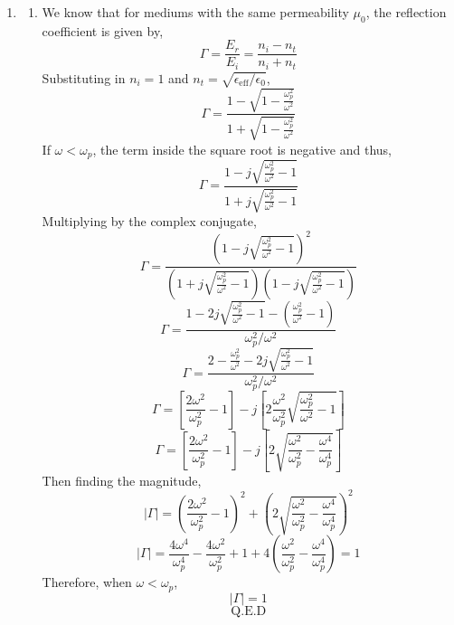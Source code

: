 \documentclass[12pt]{article}
\begin{document}
\begin{enumerate}
	\item [7.3]
	\begin{enumerate}
		\item [(a)]
		We know that for mediums with the same permeability $\mu_0$, the reflection coefficient is given by,
		\[\Gamma = \frac{E_r}{E_i}=\frac{n_i-n_t}{n_i+n_t}\]
		Substituting in $n_i=1$ and $n_t=\sqrt{\epsilon_{\mathrm{eff}}/\epsilon_0}$,
		\[\Gamma = \frac{1-\sqrt{1-\frac{\omega_p^2}{\omega^2}}}{1+\sqrt{1-\frac{\omega_p^2}{\omega^2}}}\]
		If $\omega<\omega_p$, the term inside the square root is negative and thus,
		\[\Gamma = \frac{1-j\sqrt{\frac{\omega_p^2}{\omega^2}-1}}{1+j\sqrt{\frac{\omega_p^2}{\omega^2}-1}}\]
		Multiplying by the complex conjugate,
		\[\Gamma = \frac{\left(1-j\sqrt{\frac{\omega_p^2}{\omega^2}-1}\right)^2}{\left(1+j\sqrt{\frac{\omega_p^2}{\omega^2}-1}\right)\left(1-j\sqrt{\frac{\omega_p^2}{\omega^2}-1}\right)}\]
		\[\Gamma = \frac{1-2j\sqrt{\frac{\omega_p^2}{\omega^2}-1}-\left(\frac{\omega_p^2}{\omega^2}-1\right)}{\omega_p^2/\omega^2}\]
		\[\Gamma = \frac{2-\frac{\omega_p^2}{\omega^2}-2j\sqrt{\frac{\omega_p^2}{\omega^2}-1}}{\omega_p^2/\omega^2}\]
		\[\Gamma = \left[\frac{2\omega^2}{\omega_p^2}-1\right]-j\left[2\frac{\omega^2}{\omega_p^2}\sqrt{\frac{\omega_p^2}{\omega^2}-1}\right]\]
		\[\Gamma = \left[\frac{2\omega^2}{\omega_p^2}-1\right]-j\left[2\sqrt{\frac{\omega^2}{\omega_p^2}-\frac{\omega^4}{\omega_p^4}}\right]\]
		Then finding the magnitude,
		\[|\Gamma|=\left(\frac{2\omega^2}{\omega_p^2}-1\right)^2 + \left(2\sqrt{\frac{\omega^2}{\omega_p^2}-\frac{\omega^4}{\omega_p^4}}\right)^2\]
		\[|\Gamma| = \frac{4\omega^4}{\omega_p^4}-\frac{4\omega^2}{\omega_p^2}+1 + 4\left(\frac{\omega^2}{\omega_p^2}-\frac{\omega^4}{\omega_p^4}\right)=1\]
		Therefore, when $\omega<\omega_p$,
		\[|\Gamma|=1\]
		\[\boxed{\text{Q.E.D}}\]


\end{enumerate}
\end{enumerate}
\end{document}
